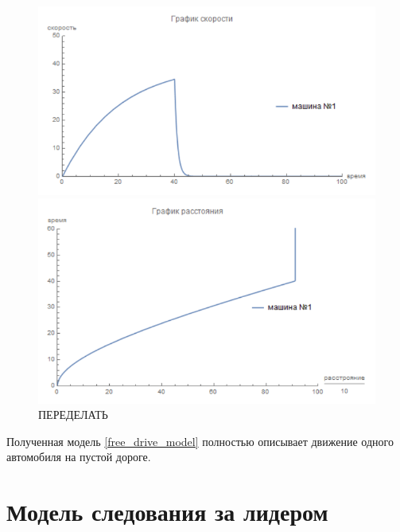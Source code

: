 \documentclass[12pt, a4paper]{extarticle}
\numberwithin{equation}{section}
\begin{document}
\begin{figure}[h!]
	\begin{center}
		\begin{minipage}[h!]{0.48\linewidth}
			\includegraphics[width=1\linewidth,height=0.2\textheight]
			{Images/test12.png}
		\end{minipage}
		\hfill 
		\begin{minipage}[h!]{0.48\linewidth}
			\includegraphics[width=1\linewidth,height=0.2\textheight]
			{Images/test22.png}
		\end{minipage}
		\caption{ПЕРЕДЕЛАТЬ}
		\label{free_drive_with_stop}
	\end{center}
\end{figure}

Полученная модель \eqref{free_drive_model} полностью описывает движение одного автомобиля на пустой дороге. 

\section{Модель следования за лидером}
\end{document}
